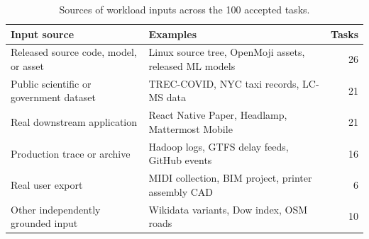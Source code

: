 \begin{table}[H]
  \centering
  \small
  \setlength{\tabcolsep}{6pt}
  \renewcommand{\arraystretch}{1.15}
  \caption{Sources of workload inputs across the 100 accepted tasks.}
  \label{tab:perfrace-workload-input-sources}
  \begin{tabularx}{\textwidth}{@{}>{\raggedright\arraybackslash}p{}
                                      >{\raggedright\arraybackslash}X
                                      r@{}}
    \toprule
    Input source & Examples & Tasks \\
    \midrule
    Released source code, model, or asset
      & Linux source tree, OpenMoji assets, released ML models & 26 \\
    Public scientific or government dataset
      & TREC-COVID, NYC taxi records, LC-MS data & 21 \\
    Real downstream application
      & React Native Paper, Headlamp, Mattermost Mobile & 21 \\
    Production trace or archive
      & Hadoop logs, GTFS delay feeds, GitHub events & 16 \\
    Real user export
      & MIDI collection, BIM project, printer assembly CAD & 6 \\
    Other independently grounded input
      & Wikidata variants, Dow index, OSM roads & 10 \\
    \bottomrule
  \end{tabularx}
\end{table}
